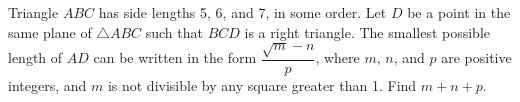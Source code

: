 Triangle $ABC$ has side lengths 5, 6, and 7, in some order. Let $D$ be a point in the same plane of $\triangle ABC$ such that $BCD$ is a right triangle. The smallest possible length of $AD$ can be written in the form $\dfrac{\sqrt m-n}{p}$, where $m$, $n$, and $p$ are positive integers, and $m$ is not divisible by any square greater than 1. Find $m+n+p$.
